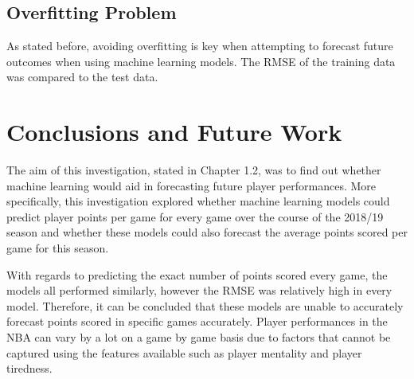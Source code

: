 \documentclass[a4paper,11pt,twoside]{article}
\begin{document}
\subsection{Overfitting Problem}
As stated before, avoiding overfitting is key when attempting to forecast future outcomes when using machine learning models. The RMSE of the training data was compared to the test data.


\begin{table}[h!]
\captionsetup{justification=centering}
\begin{center}
\end{center}
\caption{Comparing the RMSE of the training data and the testing data for every model}
\end{table}
\vspace{5mm}

\newpage
\section{Conclusions and Future Work}
The aim of this investigation, stated in Chapter 1.2, was to find out whether machine learning would aid in forecasting future player performances. More specifically, this investigation explored whether machine learning models could predict player points per game for every game over the course of the 2018/19 season and whether these models could also forecast the average points scored per game for this season. 

With regards to predicting the exact number of points scored every game, the models all performed similarly, however the RMSE was relatively high in every model. Therefore, it can be concluded that these models are unable to accurately forecast  points scored in specific games accurately. Player performances in the NBA can vary by a lot on a game by game basis due to factors that cannot be captured using the features available such as player mentality and player tiredness.
\end{document}
